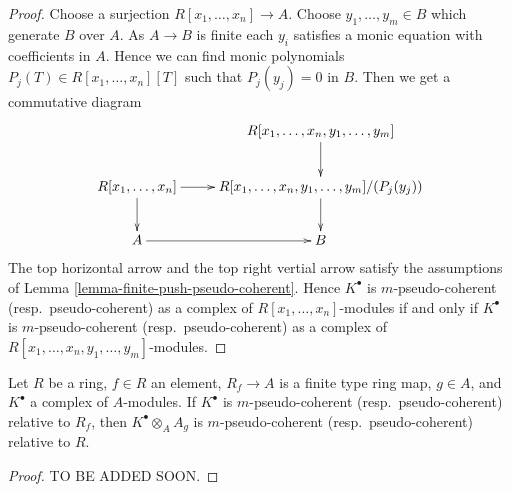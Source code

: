 \begin{proof}
Choose a surjection $R[x_1, \ldots, x_n] \to A$.
Choose $y_1, \ldots, y_m \in B$ which generate $B$ over $A$.
As $A \to B$ is finite each $y_i$ satisfies a monic equation with
coefficients in $A$. Hence we can find monic polynomials
$P_j(T) \in R[x_1, \ldots, x_n][T]$ such that $P_j(y_j) = 0$ in $B$.
Then we get a commutative diagram
$$
\xymatrix{
& R[x_1, \ldots, x_n, y_1, \ldots, y_m] \ar[d] \\
R[x_1, \ldots, x_n] \ar[d] \ar[r] &
R[x_1, \ldots, x_n, y_1, \ldots, y_m]/(P_j(y_j)) \ar[d] \\
A \ar[r] & B
}
$$
The top horizontal arrow and the top right vertial arrow
satisfy the assumptions of
Lemma \ref{lemma-finite-push-pseudo-coherent}.
Hence $K^\bullet$ is $m$-pseudo-coherent (resp.\ pseudo-coherent) as a complex
of $R[x_1, \ldots, x_n]$-modules if and only if $K^\bullet$ is
$m$-pseudo-coherent (resp.\ pseudo-coherent) as a complex of
$R[x_1, \ldots, x_n, y_1, \ldots, y_m]$-modules.
\end{proof}

\begin{lemma}
\label{lemma-localize-relative-pseudo-coherent}
Let $R$ be a ring, $f \in R$ an element, $R_f \to A$ is a finite type ring map,
$g \in A$, and $K^\bullet$ a complex of $A$-modules.
If $K^\bullet$ is $m$-pseudo-coherent (resp.\ pseudo-coherent)
relative to $R_f$, then $K^\bullet \otimes_A A_g$ is
$m$-pseudo-coherent (resp.\ pseudo-coherent) relative to $R$.
\end{lemma}

\begin{proof}
TO BE ADDED SOON.
\end{proof}






















